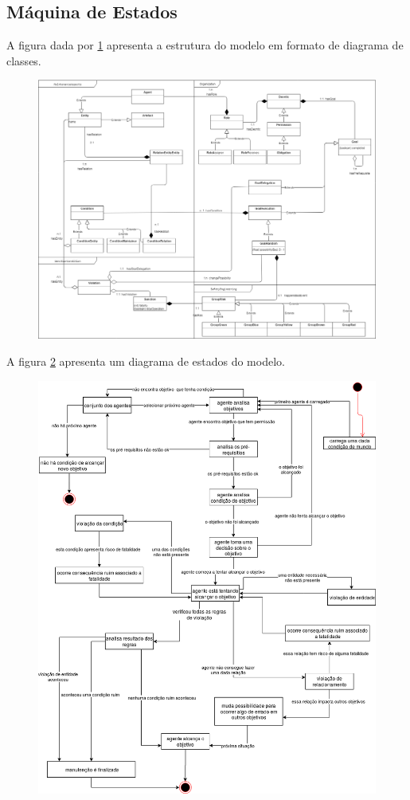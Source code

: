 \documentclass[12pt]{article}
\begin{document}
\subsection{Máquina de Estados}

A figura dada por \ref{uml} apresenta a estrutura do modelo em formato de diagrama de classes.

\begin{figure}[H]
  \centering
  \includegraphics[width=0.8\linewidth]{umlmodel} 
  \caption{}
  \label{uml}
\end{figure}

A figura \ref{state} apresenta um diagrama de estados do modelo. 

\begin{figure}[H]
  \centering
  \includegraphics[width=0.9\linewidth]{DiagramaDeEstados} 
  \caption{}
  \label{state}
\end{figure}
\end{document}

